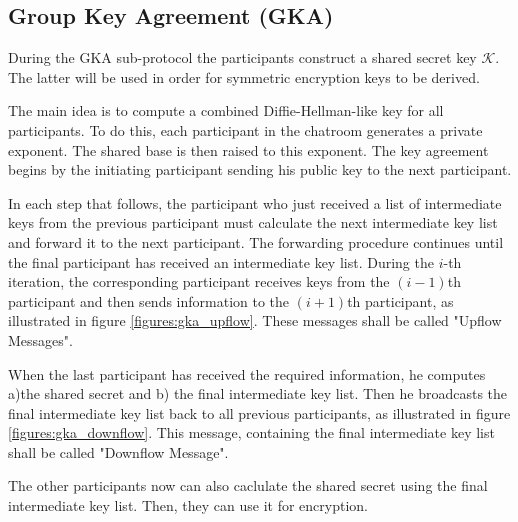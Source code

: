 \clearpage
\subsection{Group Key Agreement (GKA)}
\label{subsections:gka}

During the GKA sub-protocol the participants construct a shared secret key $\mathcal{K}$. The latter will be used in order for symmetric encryption keys to be derived.

The main idea is to compute a combined Diffie-Hellman-like key for all participants. To do this, each participant in the chatroom generates a private exponent. The shared base is then raised to this exponent. The key agreement begins by the initiating participant sending his public key to the next participant.

In each step that follows, the participant who just received a list of intermediate keys from the previous participant must calculate the next intermediate key list and forward it to the next participant. The forwarding procedure continues until the final participant has received an intermediate key list. During the $i$-th iteration, the corresponding participant receives keys from the $(i - 1)$th participant and then sends information to the $(i + 1)$th participant, as illustrated in figure \ref{figures:gka_upflow}. These messages shall be called "Upflow Messages".

When the last participant has received the required information, he computes a)the shared secret and b) the final intermediate key list. Then he broadcasts the final intermediate key list back to all previous participants, as illustrated in figure \ref{figures:gka_downflow}. This message, containing the final intermediate key list shall be called "Downflow Message".

The other participants now can also caclulate the shared secret using the final intermediate key list. Then, they can use it for encryption.

